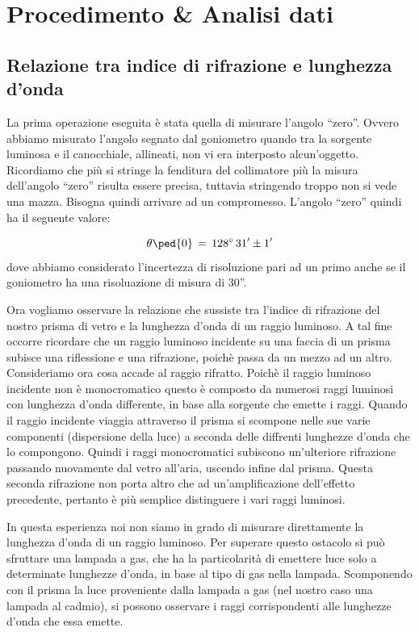 \section{Procedimento \& Analisi dati}

\subsection{Relazione tra indice di rifrazione e lunghezza d'onda}

La prima operazione eseguita è stata quella di misurare l'angolo ``zero''. Ovvero abbiamo misurato l'angolo segnato dal goniometro quando tra la sorgente luminosa e il canocchiale, allineati, non vi era interposto alcun'oggetto. Ricordiamo che più si stringe la fenditura del collimatore più la misura dell'angolo ``zero'' risulta essere precisa, tuttavia stringendo troppo non si vede una mazza. Bisogna quindi arrivare ad un compromesso.
L'angolo ``zero'' quindi ha il seguente valore:

\begin{equation}
	\theta\ped{0} \,=\, 128^\circ \,31' \pm 1'
\end{equation} 
%
dove abbiamo considerato l'incertezza di risoluzione pari ad un primo anche se il goniometro ha una risoluazione di misura di 30''.

Ora vogliamo osservare la relazione che sussiste tra l'indice di rifrazione del nostro prisma di vetro e la lunghezza d'onda di un raggio luminoso.
A tal fine occorre ricordare che un raggio luminoso incidente su una faccia di un prisma subisce una riflessione e una rifrazione, poichè passa da un mezzo ad un altro.
Consideriamo ora cosa accade al raggio rifratto. Poichè il raggio luminoso incidente non è monocromatico questo è composto da numerosi raggi luminosi con lunghezza d'onda differente, in base alla sorgente che emette i raggi. Quando il raggio incidente viaggia attraverso il prisma si scompone nelle sue varie componenti (dispersione della luce) a seconda delle diffrenti lunghezze d'onda che lo compongono. Quindi i raggi monocromatici subiscono un'ulteriore rifrazione passando nuovamente dal vetro all'aria, uscendo infine dal prisma. Questa seconda rifrazione non porta altro che ad un'amplificazione dell'effetto precedente, pertanto è più semplice distinguere i vari raggi luminosi.

In questa esperienza noi non siamo in grado di misurare direttamente la lunghezza d'onda di un raggio luminoso. Per superare questo ostacolo si può sfruttare una lampada a gas, che ha la particolarità di emettere luce solo a determinate lunghezze d'onda, in base al tipo di gas nella lampada. Scomponendo con il prisma la luce proveniente dalla lampada a gas (nel nostro caso una lampada al cadmio), si possono osservare i raggi corrispondenti alle lunghezze d'onda che essa emette.

